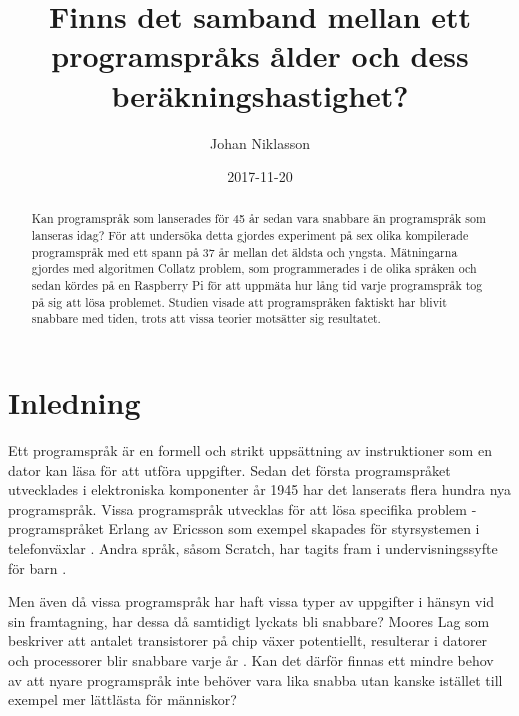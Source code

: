 \documentclass[12pt,swedish]{article}
\title{Finns det samband mellan ett programspråks ålder och dess beräkningshastighet?}
\author{Johan Niklasson}
\date{2017-11-20}
\begin{document}

\maketitle
\normalsize
\begin{center}

\begin{abstract}
Kan programspråk som lanserades för 45 år sedan vara snabbare än programspråk som lanseras idag? För att undersöka detta gjordes experiment på sex olika kompilerade programspråk med ett spann på 37 år mellan det äldsta och yngsta. Mätningarna gjordes med algoritmen Collatz problem, som programmerades i de olika språken och sedan kördes på en Raspberry Pi för att uppmäta hur lång tid varje programspråk tog på sig att lösa problemet. Studien visade att programspråken faktiskt har blivit snabbare med tiden, trots att vissa teorier motsätter sig resultatet.
\end{abstract}
\end{center}
\clearpage

\tableofcontents

\listoftables
\listoffigures
\clearpage



\section{Inledning}
Ett programspråk är en formell och strikt uppsättning av instruktioner som en dator kan läsa för att utföra uppgifter. Sedan det första programspråket utvecklades i elektroniska komponenter år 1945 \citep{bauer_wossner_1972} har det lanserats flera hundra nya programspråk. Vissa programspråk utvecklas för att lösa specifika problem - programspråket Erlang av Ericsson som exempel skapades för styrsystemen i telefonväxlar \citep{armstrong_1997}. Andra språk, såsom Scratch, har tagits fram i undervisningssyfte för barn \citep{maloney_resnick_rusk_silverman_eastmond_2010}.

Men även då vissa programspråk har haft vissa typer av uppgifter i hänsyn vid sin framtagning, har dessa då samtidigt lyckats bli snabbare? Moores Lag som beskriver att antalet transistorer på chip växer potentiellt, resulterar i datorer och processorer blir snabbare varje år \citep{schaller_1997}. Kan det därför finnas ett mindre behov av att nyare programspråk inte behöver vara lika snabba utan kanske istället till exempel mer lättlästa för människor?
\end{document}
